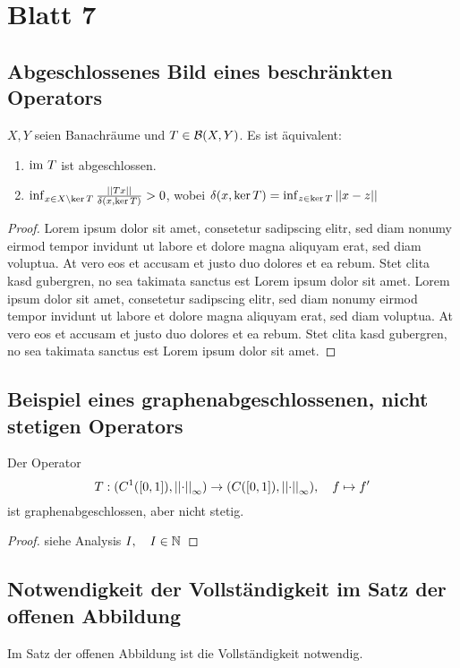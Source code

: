 \documentclass[FunkAnaSkriptSS2017.tex]{subfiles} %
\begin{document}
\section{ Blatt 7}

\subsection{ Abgeschlossenes Bild eines beschränkten Operators}
	$X,Y$ seien Banachräume und $T\in \mathcal{B}(X,Y)$. Es ist äquivalent:
	\begin{enumerate}
		\item $\textnormal{im } T$ ist abgeschlossen.
		\item $\inf_{x\in X\setminus \ker T} \frac{\left\lvert \left\lvert Tx \right\rvert \right\rvert}{\delta(x, \ker T )} > 0$, wobei $\delta(x, \ker T) = \inf_{z\in \ker T} \left\lvert \left\lvert x-z \right\rvert \right\rvert$
	\end{enumerate}
	
	\begin{proof}
	Lorem ipsum dolor sit amet, consetetur sadipscing elitr, sed diam nonumy eirmod tempor invidunt ut labore et dolore magna aliquyam erat, sed diam voluptua. At vero eos et accusam et justo duo dolores et ea rebum. Stet clita kasd gubergren, no sea takimata sanctus est Lorem ipsum dolor sit amet. Lorem ipsum dolor sit amet, consetetur sadipscing elitr, sed diam nonumy eirmod tempor invidunt ut labore et dolore magna aliquyam erat, sed diam voluptua. At vero eos et accusam et justo duo dolores et ea rebum. Stet clita kasd gubergren, no sea takimata sanctus est Lorem ipsum dolor sit amet.
	\end{proof}
	
	
\subsection{ Beispiel eines graphenabgeschlossenen, nicht stetigen Operators}
	Der Operator 
	$$T: (C^1([0,1]),\left\lvert \left\lvert \cdot \right\rvert \right\rvert_\infty ) \to (C([0,1]),\left\lvert \left\lvert \cdot \right\rvert \right\rvert_\infty ),\quad f \mapsto f'  $$
	ist graphenabgeschlossen, aber nicht stetig.
	
	\begin{proof}
	siehe Analysis $I, \quad I \in \mathbb{N}$
	\end{proof}


\subsection{ Notwendigkeit der Vollständigkeit im Satz der offenen Abbildung}
	Im Satz der offenen Abbildung ist die Vollständigkeit notwendig.
	
\end{document}
